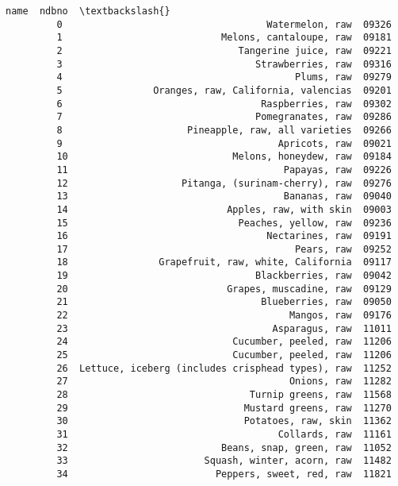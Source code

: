 \documentclass[11pt]{article}
\begin{document}
\begin{Verbatim}[commandchars=\\\{\}]
                                                         name  ndbno  \textbackslash{}
         0                                    Watermelon, raw  09326   
         1                            Melons, cantaloupe, raw  09181   
         2                               Tangerine juice, raw  09221   
         3                                  Strawberries, raw  09316   
         4                                         Plums, raw  09279   
         5                Oranges, raw, California, valencias  09201   
         6                                   Raspberries, raw  09302   
         7                                  Pomegranates, raw  09286   
         8                      Pineapple, raw, all varieties  09266   
         9                                      Apricots, raw  09021   
         10                             Melons, honeydew, raw  09184   
         11                                      Papayas, raw  09226   
         12                    Pitanga, (surinam-cherry), raw  09276   
         13                                      Bananas, raw  09040   
         14                            Apples, raw, with skin  09003   
         15                              Peaches, yellow, raw  09236   
         16                                   Nectarines, raw  09191   
         17                                        Pears, raw  09252   
         18                Grapefruit, raw, white, California  09117   
         19                                 Blackberries, raw  09042   
         20                            Grapes, muscadine, raw  09129   
         21                                  Blueberries, raw  09050   
         22                                       Mangos, raw  09176   
         23                                    Asparagus, raw  11011   
         24                             Cucumber, peeled, raw  11206   
         25                             Cucumber, peeled, raw  11206   
         26  Lettuce, iceberg (includes crisphead types), raw  11252   
         27                                       Onions, raw  11282   
         28                                Turnip greens, raw  11568   
         29                               Mustard greens, raw  11270   
         30                               Potatoes, raw, skin  11362   
         31                                     Collards, raw  11161   
         32                           Beans, snap, green, raw  11052   
         33                        Squash, winter, acorn, raw  11482   
         34                          Peppers, sweet, red, raw  11821   

\end{Verbatim}
\end{document}
